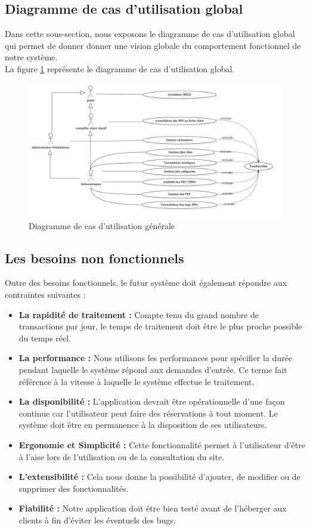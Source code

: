\subsection[Diagramme de cas d’utilisation global]{Diagramme de cas d’utilisation global}
Dans cette sous-section, nous exposons le diagramme de cas d’utilisation global qui permet de donner donner une vision globale du comportement fonctionnel de notre système.\\
La figure \ref{fig:usecasediagram-global} représente le diagramme de cas d’utilisation global.
\begin{figure}[H]
	\centering
	\includegraphics[width=1.1\linewidth]{img/conception/usecases/UseCaseDiagram-global}
	\caption[Diagramme de cas d'utilisation générale]{Diagramme de cas d'utilisation générale}
	\label{fig:usecasediagram-global}
\end{figure}
\subsection[Les besoins non fonctionnels]{Les besoins non fonctionnels}
Outre des besoins fonctionnels, le futur système doit également répondre aux contraintes suivantes :
\begin{itemize}
	\item \textbf{La rapidité de traitement :} Compte tenu du grand nombre de transactions par jour, le temps de traitement doit être le plus proche possible du temps réel.
	\item \textbf{La performance :} Nous utilisons les performances pour spécifier la durée pendant laquelle le système répond aux demandes d'entrée. Ce terme fait référence à la vitesse à laquelle le système effectue le traitement.
	\item \textbf{La disponibilité :} L'application devrait être opérationnelle d'une façon continue car l’utilisateur peut faire des réservations à tout moment. Le système doit être en permanence à la disposition de ses utilisateurs.
	\item \textbf{Ergonomie et Simplicité :} Cette fonctionnalité permet à l’utilisateur d’être à l’aise lors de l’utilisation ou de la consultation du site.
	\item \textbf{L’extensibilité :} Cela nous donne la possibilité d’ajouter, de modifier ou de supprimer des fonctionnalités.
	\item \textbf{Fiabilité :} Notre application doit être bien testé avant de l’héberger aux clients à fin d’éviter les éventuels des bugs.
\end{itemize}

